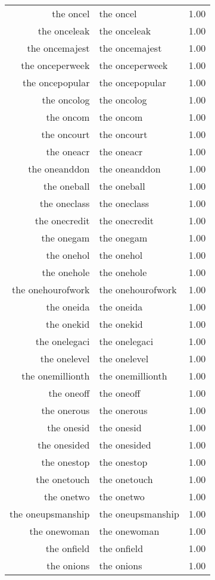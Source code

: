 \begin{table}[ht]
\begin{tabular}{rlr}
  the oncel & the oncel & 1.00 \\ 
  the onceleak & the onceleak & 1.00 \\ 
  the oncemajest & the oncemajest & 1.00 \\ 
  the onceperweek & the onceperweek & 1.00 \\ 
  the oncepopular & the oncepopular & 1.00 \\ 
  the oncolog & the oncolog & 1.00 \\ 
  the oncom & the oncom & 1.00 \\ 
  the oncourt & the oncourt & 1.00 \\ 
  the oneacr & the oneacr & 1.00 \\ 
  the oneanddon & the oneanddon & 1.00 \\ 
  the oneball & the oneball & 1.00 \\ 
  the oneclass & the oneclass & 1.00 \\ 
  the onecredit & the onecredit & 1.00 \\ 
  the onegam & the onegam & 1.00 \\ 
  the onehol & the onehol & 1.00 \\ 
  the onehole & the onehole & 1.00 \\ 
  the onehourofwork & the onehourofwork & 1.00 \\ 
  the oneida & the oneida & 1.00 \\ 
  the onekid & the onekid & 1.00 \\ 
  the onelegaci & the onelegaci & 1.00 \\ 
  the onelevel & the onelevel & 1.00 \\ 
  the onemillionth & the onemillionth & 1.00 \\ 
  the oneoff & the oneoff & 1.00 \\ 
  the onerous & the onerous & 1.00 \\ 
  the onesid & the onesid & 1.00 \\ 
  the onesided & the onesided & 1.00 \\ 
  the onestop & the onestop & 1.00 \\ 
  the onetouch & the onetouch & 1.00 \\ 
  the onetwo & the onetwo & 1.00 \\ 
  the oneupsmanship & the oneupsmanship & 1.00 \\ 
  the onewoman & the onewoman & 1.00 \\ 
  the onfield & the onfield & 1.00 \\ 
  the onions & the onions & 1.00 \\ 

\end{tabular}
\end{table}
